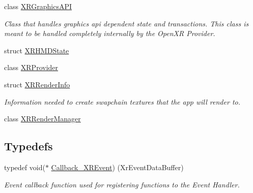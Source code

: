 \begin{DoxyCompactItemize}
class \mbox{\hyperlink{class_open_x_r_provider_1_1_x_r_graphics_a_p_i}{X\+R\+Graphics\+A\+PI}}
\begin{DoxyCompactList}\small\item\em Class that handles graphics api dependent state and transactions. This class is meant to be handled completely internally by the Open\+XR Provider. \end{DoxyCompactList}\item 
struct \mbox{\hyperlink{struct_open_x_r_provider_1_1_x_r_h_m_d_state}{X\+R\+H\+M\+D\+State}}
\item 
class \mbox{\hyperlink{class_open_x_r_provider_1_1_x_r_provider}{X\+R\+Provider}}
\item 
struct \mbox{\hyperlink{struct_open_x_r_provider_1_1_x_r_render_info}{X\+R\+Render\+Info}}
\begin{DoxyCompactList}\small\item\em Information needed to create swapchain textures that the app will render to. \end{DoxyCompactList}\item 
class \mbox{\hyperlink{class_open_x_r_provider_1_1_x_r_render_manager}{X\+R\+Render\+Manager}}
\end{DoxyCompactItemize}
\subsection*{Typedefs}
\begin{DoxyCompactItemize}
\item 
typedef void($\ast$ \mbox{\hyperlink{namespace_open_x_r_provider_a23b2e01bea1c0c0d762560792d8dff0f}{Callback\+\_\+\+X\+R\+Event}}) (Xr\+Event\+Data\+Buffer)
\begin{DoxyCompactList}\small\item\em Event callback function used for registering functions to the Event Handler. \end{DoxyCompactList}\end{DoxyCompactItemize}
